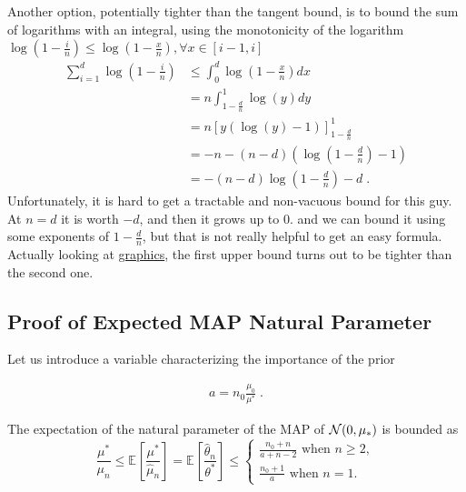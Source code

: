 \documentclass{article}
\newcommand*{\expect}[2][]{\ensuremath{\mathbb{E}_{#1} \left[ #2 \right] }} %
\newcommand{\natp}{\theta}
\newcommand{\MAPm}{\hat \mu_n}
\newcommand{\MAPt}{\hat \natp_n}
\begin{document}
Another option, potentially tighter than the tangent bound, is to bound the sum of logarithms with an integral, using the monotonicity of the logarithm $\log(1 - \frac{i}{n}) \leq \log(1- \frac{x}{n}) , \forall x \in [i - 1, i]$
\begin{align}
	\sum_{i=1}^{d} \log(1 - \frac{i}{n})
	&\leq \int_{0}^{d} \log(1- \frac{x}{n}) dx \\
	& = n \int_{1 - \frac{d}{n}}^{1} \log(y) dy \\
	& = n [ y (\log(y) - 1) ]_{1 - \frac{d}{n}}^{1} \\
	& =  - n - (n -d) (\log ( 1 - \frac{d}{n}) - 1) \\
	& = - (n -d) \log ( 1 - \frac{d}{n}) - d \; .
\end{align}
Unfortunately, it is hard to get a tractable and non-vacuous bound for this guy. At $n=d$ it is worth $-d$, and then it grows up to $0$. and we can bound it using some exponents of $1 - \frac{d}{n}$, but that is not really helpful to get an easy formula.
Actually looking at \href{https://www.desmos.com/calculator/q4sqk73tld}{graphics}, the first upper bound turns out to be tighter than the second one. 

\subsection{Proof of Expected MAP Natural Parameter}
Let us introduce a variable characterizing the importance of the prior
\begin{important}
	\begin{align}
			a=n_0 \frac{\mu_0}{\mu^*} \; .
	\end{align}
\end{important}
\begin{lemma}
	The expectation of the natural parameter of the MAP of ${\mathcal N}(0,\mu_*)$ is bounded as
\begin{equation}
		\frac{\mu^*}{\mu_n}
		\leq \expect{\frac{\mu^*}{\MAPm}} 
		= \expect{\frac{\MAPt}{\natp^*}} 
		\leq \begin{cases}
		\frac{n_0 +n}{a+n-2} \text{ when } n\geq 2,\\
		\frac{n_0 +1}{a} \text{ when } n=1.
		\end{cases}
		\label{eq:lemma_natp_bound}
	\end{equation}
\end{lemma}
\end{document}
